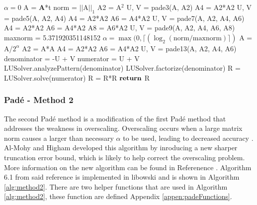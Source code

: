 \begin{algorithm}
	\caption{Pad\'e Method 1} 
	\begin{algorithmic}[1]
		\State $\alpha = 0$ 
		\State A = $\boldsymbol{A}$*t 
		\State norm = $||\text{A}||_{1}$ 
		\State A2 = A$^{2}$ 
        \State U, V = pade3(A, A2) 
        \State A4 = A2*A2
        \State  U, V = pade5(A, A2, A4) 
        \State A4 = A2*A2
        \State A6 = A4*A2
        \State U, V = pade7(A, A2, A4, A6) 
        \State A4 = A2*A2
        \State A6 = A4*A2
        \State A8 = A6*A2
        \State U, V = pade9(A, A2, A4, A6, A8) 
        \Else 
        \State maxnorm = 5.371920351148152
        \State $\alpha = \max(0, \lceil(\log_{2}(\text{norm}/\text{maxnorm})\rceil)$ 
        \State A = A/$2^{\alpha}$ 
        \State A2 = A*A
        \State A4 = A2*A2
        \State A6 = A4*A2
        \State U, V = pade13(A, A2, A4, A6) 
        \EndIf
        \State denominator = -U + V 
        \State numerator = U + V 
        \State LUSolver.analyzePattern(denominator) 
        \State LUSolver.factorize(denominator) 
        \State R = LUSolver.solve(numerator) 
         
            \State R = R*R
        \EndFor
        \State ${\text{\textbf{return}}}$ R
		\EndProcedure
	\end{algorithmic} 
	\label{alg:method1}
\end{algorithm}




\subsubsection{Pad\'e - Method 2}
The second Pad\'e method is a modification of the first Pad\'e method that addresses the weakness in overscaling. Overscaling occurs when a large matrix norm causes a larger than necessary $\alpha$ to be used, leading to decreased accuracy \cite{higham2009}. Al-Mohy and Higham developed this algorithm by inroducing a new sharper truncation error bound, which is likely to help correct the overscaling problem. More information on the new algorithm can be found in Referenence \cite{higham2009}. Algorithm 6.1 from said reference is implemented in libowski and is shown in Algorithm \ref{alg:method2}. There are two helper functions that are used in Algorithm \ref{alg:method2}, these function are defined Appendix \ref{appen:padeFunctions}. 

